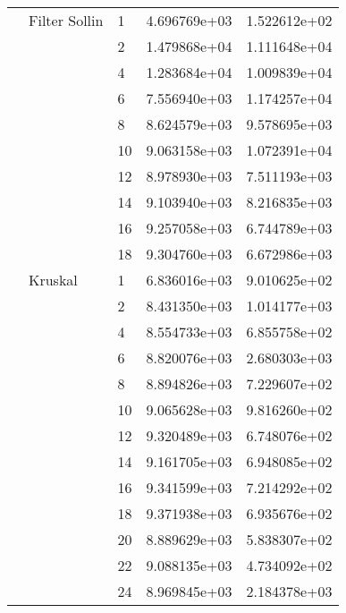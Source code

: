 \begin{tabular}{lllrr}
                      & Filter Sollin & 1  &  4.696769e+03 &  1.522612e+02 \\
                      &            & 2  &  1.479868e+04 &  1.111648e+04 \\
                      &            & 4  &  1.283684e+04 &  1.009839e+04 \\
                      &            & 6  &  7.556940e+03 &  1.174257e+04 \\
                      &            & 8  &  8.624579e+03 &  9.578695e+03 \\
                      &            & 10 &  9.063158e+03 &  1.072391e+04 \\
                      &            & 12 &  8.978930e+03 &  7.511193e+03 \\
                      &            & 14 &  9.103940e+03 &  8.216835e+03 \\
                      &            & 16 &  9.257058e+03 &  6.744789e+03 \\
                      &            & 18 &  9.304760e+03 &  6.672986e+03 \\
                      & Kruskal & 1  &  6.836016e+03 &  9.010625e+02 \\
                      &            & 2  &  8.431350e+03 &  1.014177e+03 \\
                      &            & 4  &  8.554733e+03 &  6.855758e+02 \\
                      &            & 6  &  8.820076e+03 &  2.680303e+03 \\
                      &            & 8  &  8.894826e+03 &  7.229607e+02 \\
                      &            & 10 &  9.065628e+03 &  9.816260e+02 \\
                      &            & 12 &  9.320489e+03 &  6.748076e+02 \\
                      &            & 14 &  9.161705e+03 &  6.948085e+02 \\
                      &            & 16 &  9.341599e+03 &  7.214292e+02 \\
                      &            & 18 &  9.371938e+03 &  6.935676e+02 \\
                      &            & 20 &  8.889629e+03 &  5.838307e+02 \\
                      &            & 22 &  9.088135e+03 &  4.734092e+02 \\
                      &            & 24 &  8.969845e+03 &  2.184378e+03 \\

\end{tabular}
